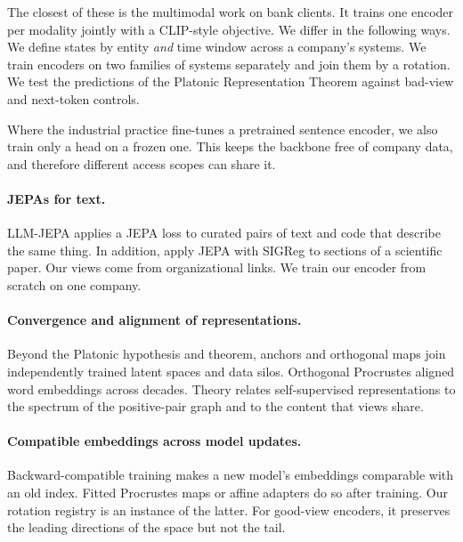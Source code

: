 \documentclass[11pt]{article}
\begin{document}
The closest of these is the multimodal work on bank clients. It trains one encoder per modality jointly with a CLIP-style objective\citep{radford2021clip}. We differ in the following ways. We define states by entity \emph{and} time window across a company's systems. We train encoders on two families of systems separately and join them by a rotation. We test the predictions of the Platonic Representation Theorem against bad-view and next-token controls.

Where the industrial practice fine-tunes a pretrained sentence encoder\citep{reimers2019sbert}, we also train only a head on a frozen one. This keeps the backbone free of company data, and therefore different access scopes can share it.

\paragraph{JEPAs for text.} LLM-JEPA applies a JEPA loss to curated pairs of text and code that describe the same thing\citep{huang2025llmjepa}. In addition, \citet{zuo2026asymmetric} apply JEPA with SIGReg to sections of a scientific paper. Our views come from organizational links. We train our encoder from scratch on one company.

\paragraph{Convergence and alignment of representations.} Beyond the Platonic hypothesis and theorem\citep{huh2024platonic,balestriero2026platonic}, anchors and orthogonal maps join independently trained latent spaces\citep{moschella2023relative,maiorca2023latent} and data silos\citep{nosaka2024collaboration}. Orthogonal Procrustes aligned word embeddings across decades\citep{hamilton2016diachronic}. Theory relates self-supervised representations to the spectrum of the positive-pair graph\citep{haochen2021spectral} and to the content that views share\citep{vonkugelgen2021content}.

\paragraph{Compatible embeddings across model updates.} Backward-compatible training makes a new model's embeddings comparable with an old index\citep{shen2020bct}. Fitted Procrustes maps or affine adapters do so after training\citep{maystre2025procrustes,vejendla2025drift}. Our rotation registry is an instance of the latter. For good-view encoders, it preserves the leading directions of the space but not the tail.
\end{document}
